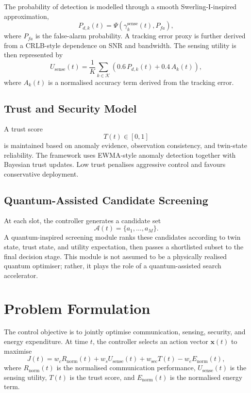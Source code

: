 \documentclass[10pt,journal]{IEEEtran}
\begin{document}
The probability of detection is modelled through a smooth Swerling-I-inspired approximation,
\begin{equation}
P_{d,k}(t)=\Psi\!\left(\gamma_k^{\mathrm{sense}}(t),P_{fa}\right),
\end{equation}
where \(P_{fa}\) is the false-alarm probability. A tracking error proxy is further derived from a CRLB-style dependence on SNR and bandwidth. The sensing utility is then represented by
\begin{equation}
U_{\mathrm{sense}}(t)=
\frac{1}{K}\sum_{k\in\mathcal{K}}
\left(0.6\,P_{d,k}(t)+0.4\,A_k(t)\right),
\end{equation}
where \(A_k(t)\) is a normalised accuracy term derived from the tracking error.

\subsection{Trust and Security Model}
A trust score
\begin{equation}
T(t)\in[0,1]
\end{equation}
is maintained based on anomaly evidence, observation consistency, and twin-state reliability. The framework uses EWMA-style anomaly detection together with Bayesian trust updates. Low trust penalises aggressive control and favours conservative deployment.

\subsection{Quantum-Assisted Candidate Screening}
At each slot, the controller generates a candidate set
\begin{equation}
\mathcal{A}(t)=\{a_1,\ldots,a_M\}.
\end{equation}
A quantum-inspired screening module ranks these candidates according to twin state, trust state, and utility expectation, then passes a shortlisted subset to the final decision stage. This module is not assumed to be a physically realised quantum optimiser; rather, it plays the role of a quantum-assisted search accelerator.

\section{Problem Formulation}
\label{sec:problem}
The control objective is to jointly optimise communication, sensing, security, and energy expenditure. At time \(t\), the controller selects an action vector \(\mathbf{x}(t)\) to maximise
\begin{equation}
\label{eq:utility}
J(t)=
w_c R_{\mathrm{norm}}(t)
+
w_s U_{\mathrm{sense}}(t)
+
w_{\mathrm{sec}}T(t)
-
w_e E_{\mathrm{norm}}(t),
\end{equation}
where \(R_{\mathrm{norm}}(t)\) is the normalised communication performance, \(U_{\mathrm{sense}}(t)\) is the sensing utility, \(T(t)\) is the trust score, and \(E_{\mathrm{norm}}(t)\) is the normalised energy term.
\end{document}
